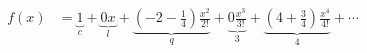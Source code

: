 \documentclass[preview]{standalone}
\begin{document}
\begin{align*}
f(x) &= \underbrace{1}_{c} + \underbrace{0x}_{l} + \underbrace{(-2-\frac{1}{4})\frac{x^2}{2!}}_{q} + \underbrace{0\frac{x^3}{3!}}_{3} + \underbrace{(4+\frac{3}{4})\frac{x^4}{4!}}_{4} + \cdots
\end{align*}
\end{document}
